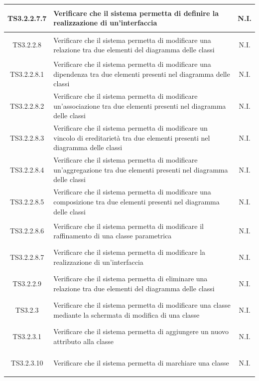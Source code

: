 \documentclass[../PianoDiQualifica.tex]{subfiles}
\begin{document}
\begin{longtable}{|c|>{\centering}p{10cm}|c|}
	\hline
	\hypertarget{TS3.2.2.7.7}{TS3.2.2.7.7} & Verificare che il sistema permetta di definire la realizzazione di un'interfaccia & N.I. \\
	\hline
	\hypertarget{TS3.2.2.8}{TS3.2.2.8} & Verificare che il sistema permetta di modificare una relazione tra due elementi del diagramma delle classi & N.I. \\
	\hline
	\hypertarget{TS3.2.2.8.1}{TS3.2.2.8.1} & Verificare che il sistema permetta di modificare una dipendenza tra due elementi presenti nel diagramma delle classi & N.I. \\
	\hline
	\hypertarget{TS3.2.2.8.2}{TS3.2.2.8.2} & Verificare che il sistema permetta di modificare un'associazione tra due elementi presenti nel diagramma delle classi & N.I. \\
	\hline
	\hypertarget{TS3.2.2.8.3}{TS3.2.2.8.3} & Verificare che il sistema permetta di modificare un vincolo di ereditarietà tra due elementi presenti nel diagramma delle classi & N.I. \\
	\hline
	\hypertarget{TS3.2.2.8.4}{TS3.2.2.8.4} & Verificare che il sistema permetta di modificare un'aggregazione tra due elementi presenti nel diagramma delle classi & N.I. \\
	\hline
	\hypertarget{TS3.2.2.8.5}{TS3.2.2.8.5} & Verificare che il sistema permetta di modificare una composizione tra due elementi presenti nel diagramma delle classi & N.I. \\
	\hline
	\hypertarget{TS3.2.2.8.6}{TS3.2.2.8.6} & Verificare che il sistema permetta di modificare il raffinamento di una classe parametrica & N.I. \\
	\hline
	\hypertarget{TS3.2.2.8.7}{TS3.2.2.8.7} & Verificare che il sistema permetta di modificare la realizzazione di un'interfaccia & N.I. \\
	\hline
	\hypertarget{TS3.2.2.9}{TS3.2.2.9} & Verificare che il sistema permetta di eliminare una relazione tra due elementi del diagramma delle classi & N.I. \\
	\hline
	\hypertarget{TS3.2.3}{TS3.2.3} & Verificare che il sistema permetta di modificare una classe mediante la schermata di modifica di una classe & N.I. \\
	\hline
	\hypertarget{TS3.2.3.1}{TS3.2.3.1} & Verificare che il sistema permetta di aggiungere un nuovo attributo alla classe & N.I. \\
	\hline
	\hypertarget{TS3.2.3.10}{TS3.2.3.10} & Verificare che il sistema permetta di marchiare una classe & N.I. \\
	\hline

\end{longtable}
\end{document}
